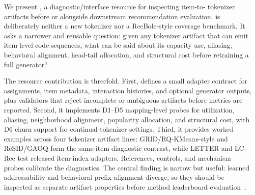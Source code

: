 We present \tool, a diagnostic/interface resource for inspecting item-to-\sid{}
tokenizer artifacts before or alongside downstream recommendation evaluation.
\tool is deliberately neither a new tokenizer nor a RecBole-style coverage
benchmark. It asks a narrower and reusable question: given any tokenizer
artifact that can emit item-level code sequences, what can be said about its
capacity use, aliasing, behavioral alignment, head-tail allocation, and
structural cost before retraining a full generator?

The resource contribution is threefold. First, \tool defines a small adapter
contract for \sid assignments, item metadata, interaction histories, and
optional generator outputs, plus validators that reject incomplete or
ambiguous artifacts before metrics are reported. Second, it implements
D1--D5 mapping-level probes for utilization, aliasing, neighborhood alignment,
popularity allocation, and structural cost, with D6 churn support for
continual-tokenizer settings. Third, it provides worked examples across four
tokenizer artifact lines: GRID/RQ-KMeans-style and ReSID/GAOQ form the
same-item diagnostic contrast, while LETTER and LC-Rec test released
item-index adapters. References, controls, and mechanism probes calibrate the
diagnostics. The central finding is narrow but useful: learned addressability
and behavioral prefix alignment diverge, so they should be inspected
as separate artifact properties before method leaderboard evaluation~\cite{cikm2026resource}.

